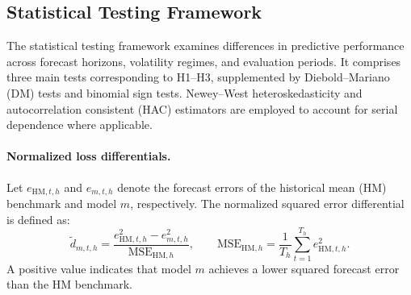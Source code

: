 \documentclass[12pt,twoside]{ord}
\begin{document}
\subsection{Statistical Testing Framework}\label{subsec:hypothesis_testing}

The statistical testing framework examines differences in predictive performance across forecast horizons, volatility regimes, and evaluation periods. It comprises three main tests corresponding to H1--H3, supplemented by Diebold--Mariano (DM) tests and binomial sign tests. Newey--West heteroskedasticity and autocorrelation consistent (HAC) estimators are employed to account for serial dependence where applicable.

\paragraph{Normalized loss differentials.} Let $e_{\mathrm{HM},t,h}$ and $e_{m,t,h}$ denote the forecast errors of the historical mean (HM) benchmark and model $m$, respectively. The normalized squared error differential is defined as:
\begin{equation}
\widetilde d_{m,t,h}
=
\frac{e^2_{\mathrm{HM},t,h}-e^2_{m,t,h}}
{\mathrm{MSE}_{\mathrm{HM},h}},
\qquad
\mathrm{MSE}_{\mathrm{HM},h}
=
\frac{1}{T_h}\sum_{t=1}^{T_h}e^2_{\mathrm{HM},t,h}.
\end{equation}
A positive value indicates that model $m$ achieves a lower squared forecast error than the HM benchmark.
\end{document}
